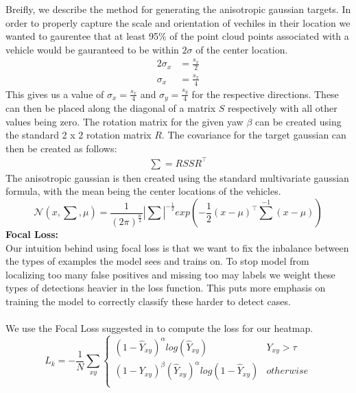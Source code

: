 \documentclass[letter]{article}
\begin{document}
	Breifly, we describe the method for generating the anisotropic gaussian targets. In order to properly capture the scale and orientation of vechiles in their location we wanted to gaurentee that at least 95\% of the point cloud points associated with a vehicle would be gauranteed to be within $2\sigma$ of the center location.
	\begin{align}
            2 \sigma_x &= \frac{s_x}{2}\\
			\sigma_x &= \frac{s_x}{4}
	\end{align}
	This gives us a value of $\sigma_x = \frac{s_x}{4}$ and $\sigma_y = \frac{s_y}{4}$ for the respective directions. These can then be placed along the diagonal of a matrix $S$ respectively with all other values being zero. The rotation matrix for the given yaw $\beta$ can be created using the standard 2 x 2 rotation matrix $R$. The covariance for the target gaussian can then be created as follows:
	\begin{align}
		\textstyle \sum = R S S R^\top
	\end{align}
	The anisotropic gaussian is then created using the standard multivariate gaussian formula, with the mean being the center locations of the vehicles.
	\begin{equation}
		\mathcal{N}(x, \textstyle \sum, \mu) = \frac{1}{(2\pi)^\frac{n}{2}}|\textstyle \sum|^{-\frac{1}{2}} exp (-\frac{1}{2}(x-\mu)^\top \textstyle \sum^{-1}(x - \mu))
	\end{equation}
	\textbf{Focal Loss:}\\
	Our intuition behind using focal loss is that we want to fix the inbalance between the types of examples the model sees and trains on. To stop model from localizing too many false positives and missing too may labels we weight these types of detections heavier in the loss function. This puts more emphasis on training the model to correctly classify these harder to detect cases.\\\\
	We use the Focal Loss suggested in \cite{objects-as-points} to compute the loss for our heatmap.
	\begin{equation}
		L_k = -\frac{1}{N} \sum_{xy} 
		\begin{cases} 
			(1 - \hat{Y}_{xy})^\alpha log (\hat{Y}_{xy}) & Y_{xy} > \tau\\
			(1 - Y_{xy})^\beta (\hat{Y}_{xy})^\alpha log(1 - \hat{Y}_{xy})& otherwise \\
		 \end{cases}
	\end{equation}
\end{document}
